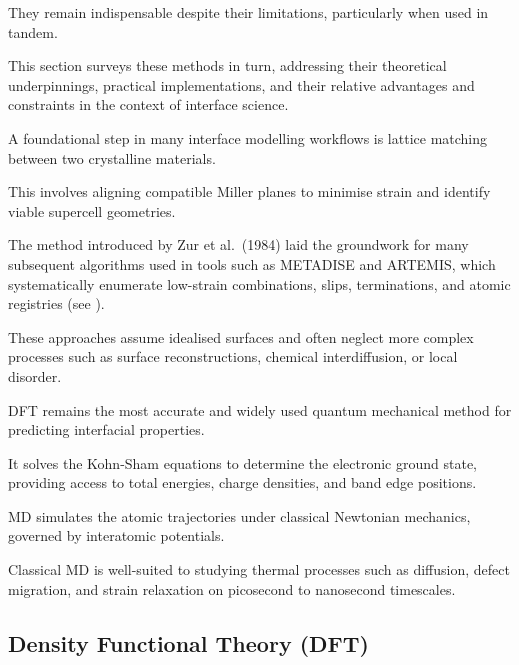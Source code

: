 They remain indispensable despite their limitations, particularly when used in tandem.

This section surveys these methods in turn, addressing their theoretical underpinnings, practical implementations, and
their relative advantages and constraints in the context of interface science.


A foundational step in many interface modelling workflows is lattice matching between two crystalline materials\cite{Gerber2023-yd, Di_Liberto2022-gz}.

This involves aligning compatible Miller planes to minimise strain and identify viable supercell geometries.

The method introduced by Zur et al.~(1984) laid the groundwork for many subsequent algorithms used in tools such as
\textsc{METADISE} and \textsc{ARTEMIS}, which systematically enumerate low-strain combinations, slips, terminations, and
atomic registries\cite{artemis_paper} (see ).


These approaches assume idealised surfaces and often neglect more complex processes such as surface reconstructions,
chemical interdiffusion, or local disorder.


DFT remains the most accurate and widely used quantum mechanical method for predicting interfacial properties.

It solves the Kohn-Sham equations to determine the electronic ground state, providing access to total energies, charge
densities, and band edge positions\cite{}.


MD simulates the atomic trajectories under classical Newtonian mechanics, governed by interatomic potentials.

Classical MD is well-suited to studying thermal processes such as diffusion, defect migration, and strain relaxation on
picosecond to nanosecond timescales\cite{Deng2023-tg}.


\subsection{Density Functional Theory (DFT)}




